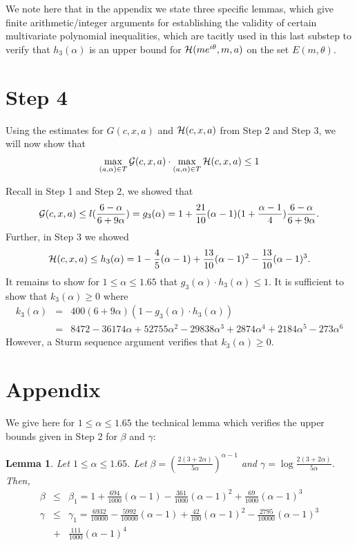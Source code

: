\documentclass[12pt]{article}
\newcommand{\ds}{\displaystyle}
\newtheorem{lemma}[theorem]{Lemma}
\begin{document}
\vspace{0.05in}

We note here that in the appendix we state three specific lemmas, which give finite arithmetic/integer arguments for establishing the validity of certain multivariate polynomial inequalities, which are tacitly used in this last substep to verify that $h_3(\alpha)$ is an upper bound for ${\cal H}(me^{i\theta},m,a)$ on the set $E(m,\theta)$.

\section{Step 4}

Using the estimates for ${\ds G(c,x,a)}$ and ${\ds {\cal H}(c,x,a)}$ from Step 2 and Step 3, we will now show that 
\begin{equation} \label{fund-new1}
\max_{(a,\alpha)\in T}{\cal G}(c,x,a) \cdot \max_{(a,\alpha)\in T}{\cal H}(c,x,a) \le 1
\end{equation}

Recall in Step 1 and Step 2, we showed that 
$$
{\cal G}(c,x,a) \le l(\frac{6-\alpha}{6+9\alpha}) = g_3(\alpha) =
1 + \frac{21}{10}(\alpha-1)(1 + \frac{\alpha-1}{4})\frac{6-\alpha}{6+9\alpha}.
$$
Further, in Step 3 we showed 
$$
{\cal H}(c,x,a) \le h_3(\alpha) =  1 - \frac{4}{5}(\alpha-1) + \frac{13}{10}(\alpha-1)^2 - \frac{13}{10}(\alpha-1)^3.
$$  
It remains to show for $1 \le \alpha \le 1.65$ that $g_3(\alpha)\cdot h_3(\alpha) \le 1$.  It is sufficient to show
that $k_3(\alpha) \ge 0$ where 
\begin{eqnarray*}
k_3(\alpha) &=& 400(6+9\alpha)(1-g_3(\alpha)\cdot h_3(\alpha)) \\
            &=& 8472-36174\alpha+52755\alpha^2-29838\alpha^3+2874\alpha^4+2184\alpha^5-273\alpha^6
\end{eqnarray*}
However, a Sturm sequence argument verifies that $k_3(\alpha) \ge 0$.

\section{Appendix}

We give here for $1 \le \alpha \le 1.65$ the technical lemma which verifies the upper bounds given in Step 2 for $\beta$ and $\gamma$:

\begin{lemma} Let $1 \le \alpha \le 1.65$. Let ${\ds \beta = \left( \frac{2(3+2\alpha)}{5\alpha} \right)^{\alpha-1} }$ and ${\ds \gamma = \log \frac{2(3+2\alpha)}{5\alpha} }$.  Then,
\begin{eqnarray*} 
\beta &\le& \beta_1 = 1+\frac{694}{1000}(\alpha-1)-\frac{361}{1000}(\alpha-1)^2+\frac{69}{1000}(\alpha-1)^3 \\ 
\gamma &\le& \gamma_1 = \frac{6932}{10000}-\frac{5992}{10000}(\alpha-1)+\frac{42}{100}(\alpha-1)^2-\frac{2795}{10000}(\alpha-1)^3 \\ \nonumber
&+&\frac{111}{1000}(\alpha-1)^4
\end{eqnarray*} 
\end{lemma}
\end{document}
